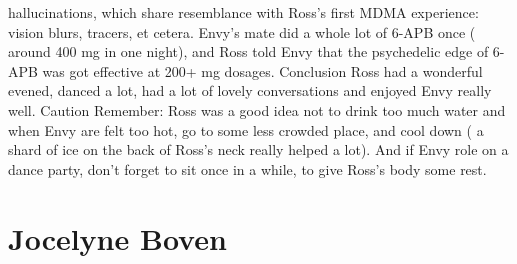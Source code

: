 \documentclass[12pt]{book}
\begin{document}
hallucinations, which share resemblance with Ross's first MDMA experience: vision blurs, tracers, et cetera. Envy's mate did a whole lot of 6-APB once ( around 400 mg in one night), and Ross told Envy that the psychedelic edge of 6-APB was got effective at 200+ mg dosages. Conclusion Ross had a wonderful evened, danced a lot, had a lot of lovely conversations and enjoyed Envy really well. Caution Remember: Ross was a good idea not to drink too much water and when Envy are felt too hot, go to some less crowded place, and cool down ( a shard of ice on the back of Ross's neck really helped a lot). And if Envy role on a dance party, don't forget to sit once in a while, to give Ross's body some rest.



\chapter{Jocelyne Boven}
\end{document}
